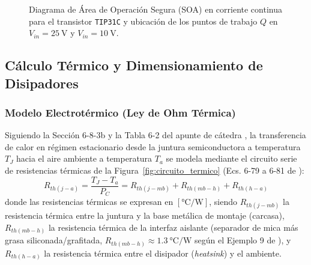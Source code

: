 \begin{figure}[htbp]
\caption{Diagrama de Área de Operación Segura (SOA) en corriente continua para el transistor \texttt{TIP31C} y ubicación de los puntos de trabajo $Q$ en $V_{in} = \SI{25}{\volt}$ y $V_{in} = \SI{10}{\volt}$.}
\label{fig:soa_plot}
\end{figure}

\subsection{Cálculo Térmico y Dimensionamiento de Disipadores}

\subsubsection{Modelo Electrotérmico (Ley de Ohm Térmica)}
Siguiendo la Sección 6-8-3b y la Tabla 6-2 del apunte de cátedra \cite{gonzalez_p2}, la transferencia de calor en régimen estacionario desde la juntura semiconductora a temperatura $T_J$ hacia el aire ambiente a temperatura $T_a$ se modela mediante el circuito serie de resistencias térmicas de la Figura~\ref{fig:circuito_termico} (Ecs. 6-79 a 6-81 de \cite{gonzalez_p2}):
\begin{equation}
    R_{th(j-a)} = \frac{T_J - T_a}{P_C} = R_{th(j-mb)} + R_{th(mb-h)} + R_{th(h-a)}
    \label{eq:ley_ohm_termica}
\end{equation}
donde las resistencias térmicas se expresan en $[\si{\celsius\per\watt}]$, siendo $R_{th(j-mb)}$ la resistencia térmica entre la juntura y la base metálica de montaje (carcasa), $R_{th(mb-h)}$ la resistencia térmica de la interfaz aislante (separador de mica más grasa siliconada/grafitada, $R_{th(mb-h)} \approx \SI{1,3}{\celsius\per\watt}$ según el Ejemplo 9 de \cite{gonzalez_p2}), y $R_{th(h-a)}$ la resistencia térmica entre el disipador (\emph{heatsink}) y el ambiente.

